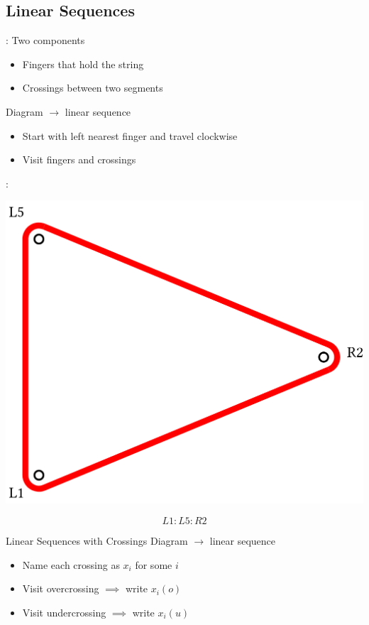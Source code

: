 \subsection{Linear Sequences}
\begin{frame}{\secname: \subsecname}
Two components
\begin{itemize}
    \item Fingers that hold the string
    \item Crossings between two segments
\end{itemize}

Diagram $\to$ linear sequence

\begin{itemize}
    \item Start with left nearest finger and travel clockwise
    \item Visit fingers and crossings
\end{itemize}

\end{frame}

\begin{frame}{\secname: \subsecname}
\begin{center}
    \includegraphics[width=0.7\columnwidth]{figures/open.png}
\end{center}
$$L1:L5:R2$$
\end{frame}

\begin{frame}[t]{Linear Sequences with Crossings}
Diagram $\to$ linear sequence
\begin{itemize}
    \item Name each crossing as $x_i$ for some $i$
    \item Visit overcrossing $\implies$ write $x_i(o)$
    \item Visit undercrossing $\implies$ write $x_i(u)$
\end{itemize}

\end{frame}


